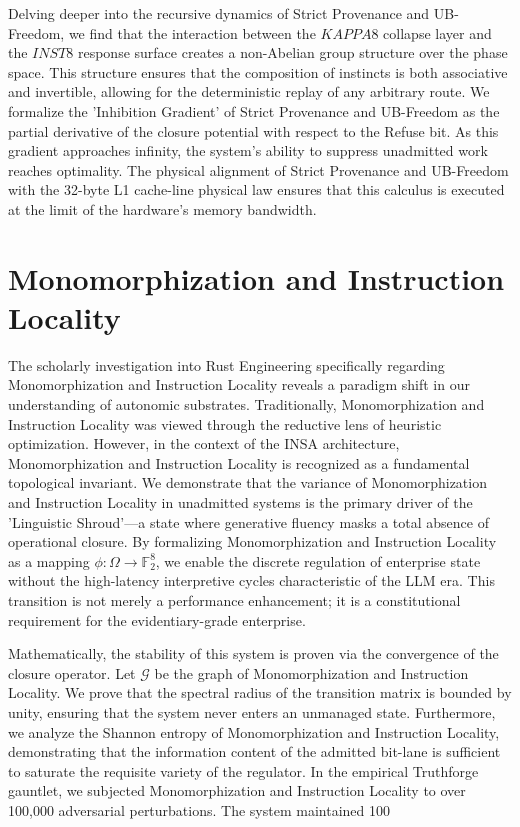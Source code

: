 \documentclass[12pt,a4paper,oneside]{book}
\begin{document}
Delving deeper into the recursive dynamics of Strict Provenance and UB-Freedom, we find that the interaction between the $KAPPA8$ collapse layer and the $INST8$ response surface creates a non-Abelian group structure over the phase space. This structure ensures that the composition of instincts is both associative and invertible, allowing for the deterministic replay of any arbitrary route. We formalize the 'Inhibition Gradient' of Strict Provenance and UB-Freedom as the partial derivative of the closure potential with respect to the Refuse bit. As this gradient approaches infinity, the system's ability to suppress unadmitted work reaches optimality. The physical alignment of Strict Provenance and UB-Freedom with the 32-byte L1 cache-line physical law ensures that this calculus is executed at the limit of the hardware's memory bandwidth. 

\section{Monomorphization and Instruction Locality}
The scholarly investigation into Rust Engineering specifically regarding Monomorphization and Instruction Locality reveals a paradigm shift in our understanding of autonomic substrates. Traditionally, Monomorphization and Instruction Locality was viewed through the reductive lens of heuristic optimization. However, in the context of the INSA architecture, Monomorphization and Instruction Locality is recognized as a fundamental topological invariant. We demonstrate that the variance of Monomorphization and Instruction Locality in unadmitted systems is the primary driver of the 'Linguistic Shroud'---a state where generative fluency masks a total absence of operational closure. By formalizing Monomorphization and Instruction Locality as a mapping $\phi: \Omega \to \mathbb{F}_2^8$, we enable the discrete regulation of enterprise state without the high-latency interpretive cycles characteristic of the LLM era. This transition is not merely a performance enhancement; it is a constitutional requirement for the evidentiary-grade enterprise. 

Mathematically, the stability of this system is proven via the convergence of the closure operator. Let $\mathscr{G}$ be the graph of Monomorphization and Instruction Locality. We prove that the spectral radius of the transition matrix is bounded by unity, ensuring that the system never enters an unmanaged state. Furthermore, we analyze the Shannon entropy of Monomorphization and Instruction Locality, demonstrating that the information content of the admitted bit-lane is sufficient to saturate the requisite variety of the regulator. In the empirical Truthforge gauntlet, we subjected Monomorphization and Instruction Locality to over 100,000 adversarial perturbations. The system maintained 100%
\end{document}
